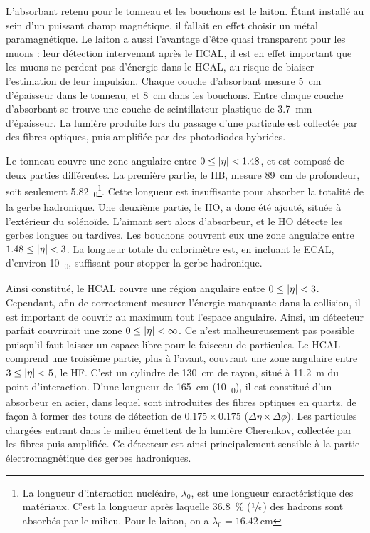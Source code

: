 L'absorbant retenu pour le tonneau et les bouchons est le laiton. Étant installé au sein d'un puissant champ magnétique, il fallait en effet choisir un métal paramagnétique. Le laiton a aussi l'avantage d'être quasi transparent pour les muons : leur détection intervenant après le HCAL, il est en effet important que les muons ne perdent pas d'énergie dans le HCAL, au risque de biaiser l'estimation de leur impulsion. Chaque couche d'absorbant mesure \SI{5}{\cm} d'épaisseur dans le tonneau, et \SI{8}{\cm} dans les bouchons. Entre chaque couche d'absorbant se trouve une couche de scintillateur plastique de \SI{3.7}{\mm} d'épaisseur. La lumière produite lors du passage d'une particule est collectée par des fibres optiques, puis amplifiée par des photodiodes hybrides.

\medskip

Le tonneau couvre une zone angulaire entre $0 \leq \lvert \eta \rvert < \num{1.48}$, et est composé de deux parties différentes. La première partie, le HB, mesure \SI{89}{\cm} de profondeur, soit seulement \SI{5.82}{\lambda_0}\footnote{La longueur d'interaction nucléaire, $\lambda_0$, est une longueur caractéristique des matériaux. C'est la longueur après laquelle \SI{36.8}{\%} ($\sfrac{1}{e}$) des hadrons sont absorbés par le milieu. Pour le laiton, on a $\lambda_0 = \SI{16.42}{\cm}$}. Cette longueur est insuffisante pour absorber la totalité de la gerbe hadronique. Une deuxième partie, le HO, a donc été ajouté, située à l'extérieur du solénoïde. L'aimant sert alors d'absorbeur, et le HO détecte les gerbes longues ou tardives. Les bouchons couvrent eux une zone angulaire entre $1.48 \leq \lvert \eta \rvert < \num{3}$. La longueur totale du calorimètre est, en incluant le ECAL, d'environ \SI{10}{\lambda_0}, suffisant pour stopper la gerbe hadronique.

\bigskip

Ainsi constitué, le HCAL couvre une région angulaire entre $0 \leq \lvert \eta \rvert < \num{3}$. Cependant, afin de correctement mesurer l'énergie manquante dans la collision, il est important de couvrir au maximum tout l'espace angulaire. Ainsi, un détecteur parfait couvrirait une zone $0 \leq \lvert \eta \rvert < \infty$. Ce n'est malheureusement pas possible puisqu'il faut laisser un espace libre pour le faisceau de particules. Le HCAL comprend une troisième partie, plus à l'avant, couvrant une zone angulaire entre $\num{3} \leq \lvert \eta \rvert < \num{5}$, le HF. C'est un cylindre de \SI{130}{\cm} de rayon, situé à \SI{11.2}{\m} du point d'interaction. D'une longueur de \SI{165}{\cm} (\tilde \SI{10}{\lambda_0}), il est constitué d'un absorbeur en acier, dans lequel sont introduites des fibres optiques en quartz, de façon à former des tours de détection de $\num{0.175} \times \num{0.175}$ ($\Delta\eta \times \Delta\phi$). Les particules chargées entrant dans le milieu émettent de la lumière Cherenkov, collectée par les fibres puis amplifiée. Ce détecteur est ainsi principalement sensible à la partie électromagnétique des gerbes hadroniques.


